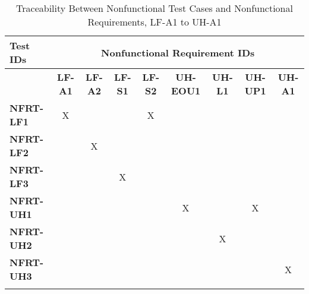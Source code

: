 \documentclass[12pt, titlepage]{article}
\begin{document}
\begin{landscape}
\begin{longtable}{|l|cccccccc|}
  \hline
  \textbf{Test IDs} & \multicolumn{8}{c|}{\textbf{Nonfunctional Requirement IDs}} \\
  \hline
  ~                 & \textbf{LF-A1} & \textbf{LF-A2} & \textbf{LF-S1} & \textbf{LF-S2} & \textbf{UH-EOU1} & \textbf{UH-L1} & \textbf{UH-UP1} & \textbf{UH-A1} \\
  \hline
  \textbf{NFRT-LF1} & X              & ~              & ~              & X              & ~                & ~              & ~               & ~              \\
  \textbf{NFRT-LF2} & ~              & X              & ~              & ~              & ~                & ~              & ~               & ~              \\
  \textbf{NFRT-LF3} & ~              & ~              & X              & ~              & ~                & ~              & ~               & ~              \\
  \textbf{NFRT-UH1} & ~              & ~              & ~              & ~              & X                & ~              & X               & ~              \\
  \textbf{NFRT-UH2} & ~              & ~              & ~              & ~              & ~                & X              & ~               & ~              \\
  \textbf{NFRT-UH3} & ~              & ~              & ~              & ~              & ~                & ~              & ~               & X              \\
  \hline
\caption{Traceability Between Nonfunctional Test Cases and Nonfunctional Requirements, LF-A1 to UH-A1} \\
\end{longtable}

\newpage


\end{landscape}
\end{document}
